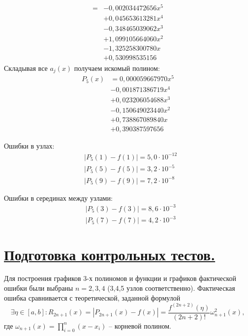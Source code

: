 \documentclass[a4paper, 12pt]{article}
\begin{document}
\begin{itemize}
\begin{equation*}
\begin{aligned}
			   =&-0,002034472656x^5\\
				&+0,045653613281x^4\\
				&-0,348465039062x^3\\
				&+1,099105664060x^2\\ 
				&-1,325258300780x\\
				&+0,530998535156
			\end{aligned}
		\end{equation*}
		Складывая все $a_j(x)$ получаем искомый полином:
		\begin{equation*}
			\begin{aligned}
				P_5(x)&=0,000059667970x^{5}\\
					  &-0,001871386719x^{4}\\
					  &+0,023206054688x^{3}\\
					  &-0,150649023440x^{2}\\
					  &+0,738867089840x\\
					  &+0,390387597656
			\end{aligned}
		\end{equation*}
	\end{itemize}
	
	Ошибки в узлах:
	\begin{equation*}
		\begin{aligned}
			&|P_5(1)-f(1)|=5,0\cdot10^{-12}\\
			&|P_5(5)-f(5)|=3,2\cdot10^{-5}\\
			&|P_5(9)-f(9)|=7,2\cdot10^{-8}
		\end{aligned}
	\end{equation*}

	Ошибки в серединах между узлами:
	\begin{equation*}
		\begin{aligned}
			&|P_5(3)-f(3)|=8,6\cdot10^{-3}\\
			&|P_5(7)-f(7)|=4,2\cdot10^{-3}
		\end{aligned}
	\end{equation*}
	
	\section{\underline{Подготовка контрольных тестов.}}
	
    Для построения графиков 3-х полиномов и функции и графиков фактической ошибки были выбраны $n=2,3,4$ (3,4,5 узлов соответственно). Фактическая ошибка сравнивается с теоретической, заданной формулой
    \begin{equation} \label{theor_err}
    	\exists \eta \in[a,b]:R_{2n+1}(x)=|P_{2n+1}(x)-f(x)|=\frac{f^{(2n+2)}(\eta)}{(2n+2)!}\omega^2_{n+1}(x),
    \end{equation} 
	где $\displaystyle \omega_{n+1}(x)=\prod\limits_{i=0}^n(x-x_i)$ -- корневой полином.
	
\end{document}
